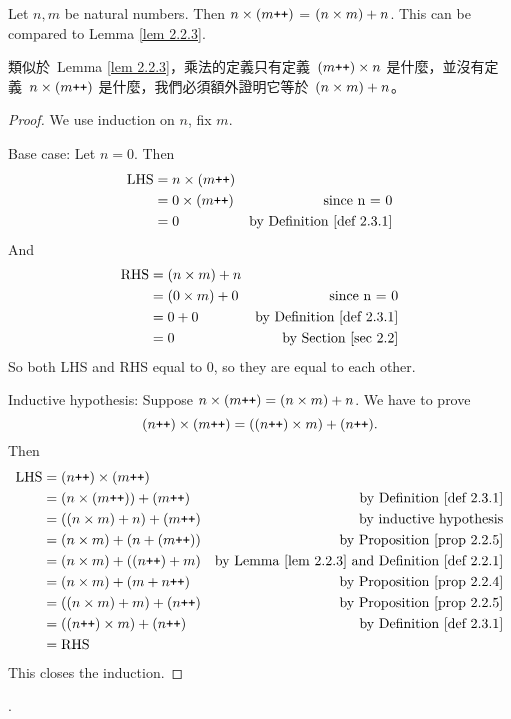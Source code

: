 \begin{additional corollary} \label{ac 2.3.3}
Let \(n, m\) be natural numbers. Then \(n \times (m\texttt{++})\) = \((n \times m) + n\). This can be compared to Lemma \ref{lem 2.2.3}.
\end{additional corollary}
\begin{note}
類似於\ Lemma \ref{lem 2.2.3}，乘法的定義只有定義\ \((m\texttt{++}) \times n\) 是什麼，並沒有定義\ \(n \times (m\texttt{++})\) 是什麼，我們必須額外證明它等於\ \((n \times m) + n\)。
\end{note}
\begin{proof}
We use induction on \(n\), fix \(m\).

Base case: Let \(n = 0\). Then
\begin{align*}
    \text{LHS} & = n \times (m\texttt{++}) \\
               & = 0 \times (m\texttt{++}) & \text{since n = 0} \\
               & = 0 & \text{by Definition \ref{def 2.3.1}}
\end{align*}
And
\begin{align*}
    \text{RHS} & = (n \times m) + n \\
               & = (0 \times m) + 0 & \text{since n = 0} \\
               & = 0 + 0 & \text{by Definition \ref{def 2.3.1}} \\
               & = 0 & \text{by Section \ref{sec 2.2}}
\end{align*}
So both LHS and RHS equal to \(0\), so they are equal to each other.

Inductive hypothesis: Suppose \(n \times (m\texttt{++}) = (n \times m) + n\). We have to prove
\[(n\texttt{++}) \times (m\texttt{++}) = ((n\texttt{++}) \times m) + (n\texttt{++}).\]
Then
\begin{align*}
    \text{LHS} & = (n\texttt{++}) \times (m\texttt{++}) \\
               & = (n \times (m\texttt{++})) + (m\texttt{++}) & \text{by Definition \ref{def 2.3.1}} \\
               & = ((n \times m) + n) + (m\texttt{++}) & \text{by inductive hypothesis} \\
               & = (n \times m) + (n + (m\texttt{++})) & \text{by Proposition \ref{prop 2.2.5}} \\
               & = (n \times m) + ((n\texttt{++}) + m) & \text{by Lemma \ref{lem 2.2.3} and Definition \ref{def 2.2.1}} \\
               & = (n \times m) + (m + n\texttt{++}) & \text{by Proposition \ref{prop 2.2.4}} \\
               & = ((n \times m) + m) + (n\texttt{++}) & \text{by Proposition \ref{prop 2.2.5}} \\
               & = ((n\texttt{++}) \times m) + (n\texttt{++}) & \text{by Definition \ref{def 2.3.1}} \\
               & = \text{RHS}
\end{align*}
This closes the induction.
\end{proof}.

